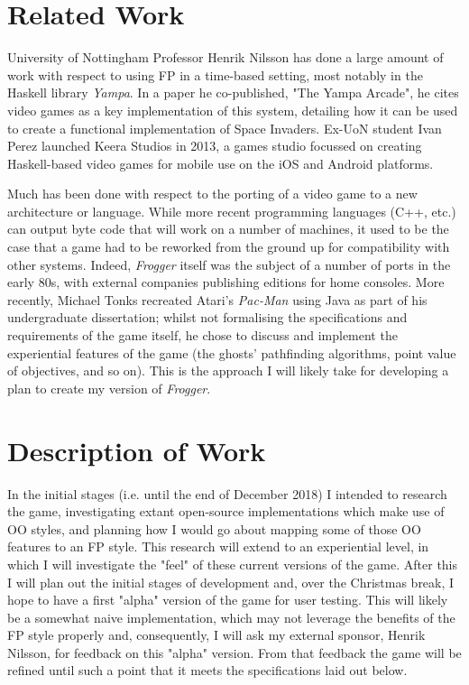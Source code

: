 \documentclass[12pt, a4paper]{report}
\begin{document}
\section{Related Work}
University of Nottingham Professor Henrik Nilsson has done a large amount of work with respect to using FP in a time-based setting, most notably in the Haskell library \textit{Yampa}.
In a paper he co-published, "The Yampa Arcade"\cite{yampaarcade}, he cites video games as a key implementation of this system, detailing how it can be used to create a functional implementation of Space Invaders.
Ex-UoN student Ivan Perez launched Keera Studios in 2013, a games studio focussed on creating Haskell-based video games for mobile use on the iOS and Android platforms.

\par

Much has been done with respect to the porting of a video game to a new architecture or language.
While more recent programming languages (C++, etc.) can output byte code that will work on a number of machines, it used to be the case that a game had to be reworked from the ground up for compatibility with other systems.
Indeed, \textit{Frogger} itself was the subject of a number of ports in the early 80s, with external companies publishing editions for home consoles.
More recently, Michael Tonks recreated Atari's \textit{Pac-Man} using Java as part of his undergraduate dissertation; whilst not formalising the specifications and requirements of the game itself, he chose to discuss and implement the experiential features of the game (the ghosts' pathfinding algorithms, point value of objectives, and so on)\cite{michaeltonks}.
This is the approach I will likely take for developing a plan to create my version of \textit{Frogger}.


\section{Description of Work}
In the initial stages (i.e. until the end of December 2018) I intended to research the game, investigating extant open-source implementations which make use of OO styles, and planning how I would go about mapping some of those OO features to an FP style.
This research will extend to an experiential level, in which I will investigate the "feel" of these current versions of the game.
After this I will plan out the initial stages of development and, over the Christmas break, I hope to have a first "alpha" version of the game for user testing.
This will likely be a somewhat naive implementation, which may not leverage the benefits of the FP style properly and, consequently, I will ask my external sponsor, Henrik Nilsson, for feedback on this "alpha" version.
From that feedback the game will be refined until such a point that it meets the specifications laid out below.
\end{document}
